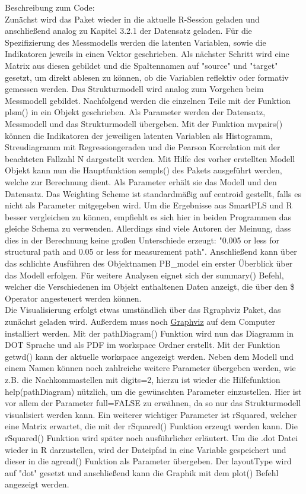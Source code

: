\documentclass{article}\usepackage[]{graphicx}\usepackage[]{color}
\begin{document}
Beschreibung zum Code:\\
Zunächst wird das Paket wieder in die aktuelle R-Session geladen und anschließend analog zu Kapitel 3.2.1 der Datensatz geladen. Für die Spezifizierung des Messmodells werden die latenten Variablen, sowie die Indikatoren jeweils in einen Vektor geschrieben. Als nächster Schritt wird eine Matrix aus diesen gebildet und die Spaltennamen auf "source" und "target" gesetzt, um direkt ablesen zu können, ob die Variablen reflektiv oder formativ gemessen werden. Das Strukturmodell wird analog zum Vorgehen beim Messmodell gebildet. Nachfolgend werden die einzelnen Teile mit der Funktion plsm() in ein Objekt geschrieben. Als Parameter werden der Datensatz, Messmodell und das Strukturmodell übergeben. Mit der Funktion mvpairs() können die Indikatoren der jeweiligen latenten Variablen als Histogramm, Streudiagramm mit Regressiongeraden und die Pearson Korrelation mit der beachteten Fallzahl N dargestellt werden. Mit Hilfe des vorher erstellten Modell Objekt kann nun die Hauptfunktion sempls() des Pakets ausgeführt werden, welche zur Berechnung dient. Als Parameter erhält sie das Modell und den Datensatz. Das Weighting Scheme ist standardmäßig auf centroid gestellt, falls es nicht als Parameter mitgegeben wird. Um die Ergebnisse aus SmartPLS und R besser vergleichen zu können, empfiehlt es sich hier in beiden Programmen das gleiche Schema zu verwenden. Allerdings sind viele Autoren der Meinung, dass dies in der Berechnung keine großen Unterschiede erzeugt: "0.005 or less for structural path and 0.05 or less for measurement path".\cite{noonan1982pls} Anschließend kann über das schlichte Ausführen des Objektnamen PB\_model ein erster Überblick über das Modell erfolgen. Für weitere Analysen eignet sich der summary() Befehl, welcher die Verschiedenen im Objekt enthaltenen Daten anzeigt, die über den \$ Operator angesteuert werden können. \\
Die Visualisierung erfolgt etwas umständlich über das Rgraphviz Paket, das zunächst geladen wird. Außerdem muss noch \href{http://www.graphviz.org/}{Graphviz} auf dem Computer installiert werden. Mit der pathDiagram() Funktion wird nun das Diagramm in DOT Sprache und als PDF im workspace Ordner erstellt. Mit der Funktion getwd() kann der aktuelle workspace angezeigt werden. Neben dem Modell und einem Namen können noch zahlreiche weitere Parameter übergeben werden, wie z.B. die Nachkommastellen mit digits=2, hierzu ist wieder die Hilfefunktion help(pathDiagram) nützlich, um die gewünschten Parameter einzustellen. Hier ist vor allem der Parameter full=FALSE zu erwähnen, da so nur das Strukturmodell visualisiert werden kann. Ein weiterer wichtiger Parameter ist rSquared, welcher eine Matrix erwartet, die mit der rSquared() Funktion erzeugt werden kann. Die rSquared() Funktion wird später noch ausführlicher erläutert. Um die .dot Datei wieder in R darzustellen, wird der Dateipfad in eine Variable gespeichert und dieser in die agread() Funktion als Parameter übergeben. Der layoutType wird auf "dot" gesetzt und anschließend kann die Graphik mit dem plot() Befehl angezeigt werden.\\
\end{document}
